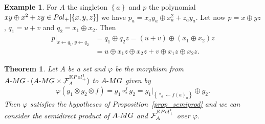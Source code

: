 \documentclass[11pt]{article}
\newtheorem{theorem}[theo]{Theorem}
\theoremstyle{definition}
\newtheorem{exam}[theo]{Example}
\numberwithin{equation}{section}
\newcommand{\take}{\leftarrow}
\newcommand{\set}[1]{\left\{#1\right\}}
\newcommand{\spe}[1]{\normalfont{\textsc{#1}}}
\newcommand{\K}{\mathbb{K}}
\newcommand{\comp}[1][\ast]{\circ_{#1}}
\newcommand{\MG}{\spe{MG}}
\newcommand{\Poly}{\spe{Pol}_+}
\newcommand{\augm}[2]{#1\text{-}#2}
\newcommand{\func}[2]{\mathcal{F}_{#1}^{#2}}
\begin{document}
\begin{exam}
    For $A$ the singleton $\set{a}$ and $p$ the polynomial $xy\oplus x^2 + zy\in\Poly[\set{x,y,z}]$ we 
    have $p_a= x_ay_a\oplus x_a^2 + z_ay_a$. Let now $p=x\oplus yz$, $q_1 = u+v$ and
    $q_2=x_1\oplus x_2$. Then
    \begin{equation}\begin{split}
        p|_{x\take q_1, y\take q_2} &= q_1\oplus q_2z = (u+v)\oplus (x_1\oplus x_2)z \\
        &= u\oplus x_1z\oplus x_2z + v\oplus x_1z\oplus x_2z.
    \end{split}\end{equation}
\end{exam}

\begin{theorem}\label{th_op_ins}
    Let $A$ be a set and $\varphi$ be the morphism from 
    $\augm{A}{\MG}\cdot(\augm{A}{\MG}\times\func{A}{\K\Poly^1})$ to $\augm{A}{\MG}$ given by
    \begin{equation}
        \varphi(g_1\otimes g_2 \otimes f) = g_1\comp^f g_2 = g_1|_{\set{\ast_a\take f(a)_a}}\oplus g_2.
    \end{equation}
    Then $\varphi$ satisfies the hypotheses of Proposition~\ref{prop_semiprod} and we can consider the 
    semidirect product of $\augm{A}{\MG}$ and $\mathcal{F}_A^{\K \Poly^1}$ over $\varphi$.
\end{theorem}
\end{document}
